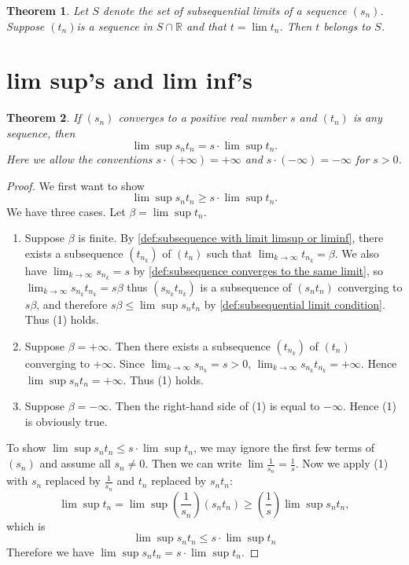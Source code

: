 \documentclass[12pt, lettersize]{book}
\newtheorem{thm}{Theorem}[section]
\begin{document}
	\begin{thm}
		Let $S$ denote the set of subsequential limits of a sequence $(s_n)$. Suppose $(t_n)$is a sequence in $S\cap\mathbb{R}$ and that $t=\lim t_n$. Then $t$ belongs to $S$.
	\end{thm}

	\newpage
	
	\section{lim sup's and lim inf's}
	\setcounter{equation}{0}
	\begin{thm}\label{thm:12.1}
		If $(s_n)$ converges to a positive real number $s$ and $(t_n)$ is any sequence, then
		\begin{displaymath}
			\lim\sup s_nt_n=s\cdot\lim\sup t_n.
		\end{displaymath}
		Here we allow the conventions $s\cdot(+\infty)=+\infty$ and $s\cdot(-\infty)=-\infty$ for $s>0$.
	\end{thm}
	\begin{proof}
		We first want to show
		\begin{equation}
			\lim\sup s_nt_n\geq s\cdot\lim\sup t_n.
		\end{equation}
		We have three cases. Let $\beta=\lim\sup t_n$.
		\begin{enumerate}
			\item Suppose $\beta$ is finite. By \ref{def:subsequence with limit limsup or liminf}, there exists a subsequence
			$(t_{n_k})$ of $(t_n)$ such that $\lim_{k\rightarrow\infty}t_{n_k}=\beta$. We also have $\lim_{k\rightarrow\infty}s_{n_k}=s$ by \ref{def:subsequence converges to the same limit}, so $\lim_{k\rightarrow\infty}s_{n_k}t_{n_k}=s\beta$ thus $(s_{n_k}t_{n_k})$ is a subsequence of $(s_nt_n)$ converging to $s\beta$, and therefore $s\beta\leq\lim\sup s_nt_n$ by \ref{def:subsequential limit condition}. Thus (1) holds.
			\item Suppose $\beta=+\infty$. Then there exists a subsequence $(t_{n_k})$ of $(t_n)$ converging to $+\infty$.
			Since $\lim_{k\rightarrow\infty}s_{n_k}=s>0$, $\lim_{k\rightarrow\infty}s_{n_k}t_{n_k}=+\infty$. Hence $\lim\sup s_nt_n=+\infty$. Thus (1) holds.
			\item Suppose $\beta=-\infty$. Then the right-hand side of (1) is equal to $-\infty$. Hence (1) is obviously true.	
		\end{enumerate}
		To show $\lim\sup s_nt_n\leq s\cdot\lim\sup t_n$, we may ignore the first few terms of $(s_n)$ and assume all $s_n\neq0$. Then we can write $\lim\frac{1}{s_n}=\frac{1}{s}$. Now we apply (1) with $s_n$ replaced by $\frac{1}{s_n}$ and $t_n$ replaced by $s_nt_n$:
		\begin{displaymath}
			\lim\sup t_n=\lim\sup(\frac{1}{s_n})(s_nt_n)\geq(\frac{1}{s})\lim\sup s_nt_n,
		\end{displaymath}
		which is 
		\begin{displaymath}
			\lim\sup s_nt_n\leq s\cdot\lim\sup t_n
		\end{displaymath}
		Therefore we have $\lim\sup s_nt_n=s\cdot\lim\sup t_n$.
	\end{proof}
	
\end{document}

